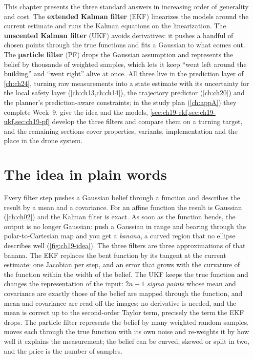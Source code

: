 This chapter presents the three standard answers in increasing order of
generality and cost. The \textbf{extended Kalman filter}
(EKF) linearizes the models around the current estimate and runs the Kalman
equations on the linearization. The \textbf{unscented Kalman filter}
 (UKF) avoids derivatives: it pushes a handful
of chosen points through the true functions and fits a Gaussian to what comes
out. The \textbf{particle filter} (PF) drops the
Gaussian assumption and represents the belief by thousands of weighted
samples, which lets it keep ``went left around the building'' and ``went
right'' alive at once. All three live in the prediction layer of
\cref{ch:ch24}, turning raw measurements into a state estimate with its
uncertainty for the local safety layer (\cref{ch:ch13,ch:ch14}), the trajectory
predictor (\cref{ch:ch20}) and the planner's prediction-aware constraints;
in the study plan (\cref{ch:appA}) they complete Week~9.
 give the idea and the
models, \cref{sec:ch19-ekf,sec:ch19-ukf,sec:ch19-pf} develop the three
filters and compare them on a turning target, and the remaining sections
cover properties, variants, implementation and the place in the drone system.

\section{The idea in plain words}
\label{sec:ch19-intuition}

Every filter step pushes a Gaussian belief through a function and describes
the result by a mean and a covariance. For an affine function the result
is Gaussian (\cref{ch:ch02}) and the Kalman filter is exact. As soon as the function bends, the output is
no longer Gaussian: push a Gaussian in range and bearing through the
polar-to-Cartesian map and you get a \emph{banana}, a curved region that no
ellipse describes well (\cref{fig:ch19-idea}). The three filters are three
approximations of that banana. The EKF replaces the bent function by its
tangent at the current estimate: one Jacobian per step, and an error that
grows with the curvature of the function within the width of the belief. The
UKF keeps the true function and changes the representation of the input:
$2n+1$ \emph{sigma points} whose mean and covariance are exactly those of the
belief are mapped through the function, and mean and covariance are read off
the images; no derivative is needed, and the mean is correct up to the
second-order Taylor term, precisely the term the EKF drops. The particle
filter represents the belief by many weighted random samples, moves each
through the true function with its own noise and re-weights it by how well
it explains the measurement; the belief can be curved, skewed or split in
two, and the price is the number of samples.

